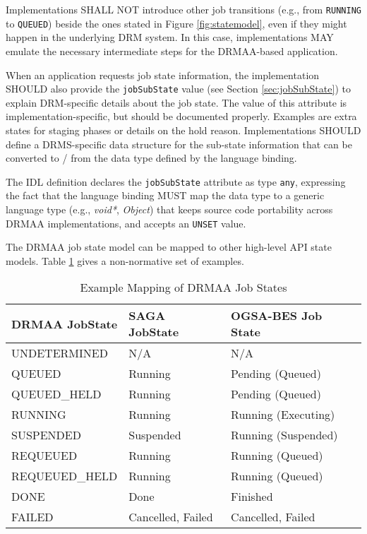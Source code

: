 \documentclass{article}
\newcommand{\h}[1]{\lstinline|#1|}
\newcommand{\langbind}[1]{\begin{shaded}#1\end{shaded}}
\begin{document}
Implementations SHALL NOT introduce other job transitions (e.g., from \h{RUNNING} to \h{QUEUED}) beside the ones stated in Figure \ref{fig:statemodel}, even if they might happen in the underlying DRM system. In this case, implementations MAY emulate the necessary intermediate steps for the DRMAA-based application. 

When an application requests job state information, the implementation SHOULD also provide the \h{jobSubState} value (see Section \ref{sec:jobSubState}) to explain DRM-specific details about the job state. The value of this attribute is implementation-specific, but should be documented properly. Examples are extra states for staging phases or details on the hold reason. Implementations SHOULD define a DRMS-specific data structure for the sub-state information that can be converted to / from the data type defined by the language binding.

\langbind{
The IDL definition declares the \h{jobSubState} attribute as type \h{any}, expressing the fact that the language binding MUST map the data type to a generic language type (e.g., \emph{void*}, \emph{Object}) that keeps source code portability across DRMAA implementations, and accepts an \h{UNSET} value. 
}

The DRMAA job state model can be mapped to other high-level API state models. Table \ref{tab:statemappings} gives a non-normative set of examples. 

\begin{table}[ht]
\centering
\begin{tabularx}{\textwidth}{|X|X|X|}
\hline
DRMAA JobState & SAGA JobState \cite{saga} & OGSA-BES Job State \cite{gfd.108}\\
\hline
UNDETERMINED   & N/A                       & N/A \\
QUEUED               & Running                   & Pending (Queued) \\
QUEUED\_HELD   & Running                 & Pending (Queued)  \\
RUNNING            & Running                   & Running (Executing) \\
SUSPENDED         & Suspended                 & Running (Suspended) \\
REQUEUED          & Running                 &  Running (Queued) \\
REQUEUED\_HELD & Running                & Running (Queued) \\
DONE                     & Done                      & Finished \\
FAILED                 & Cancelled, Failed         & Cancelled, Failed \\
\hline
\end{tabularx}
\caption{Example Mapping of DRMAA Job States}
\label{tab:statemappings}
\end{table}
\end{document}
